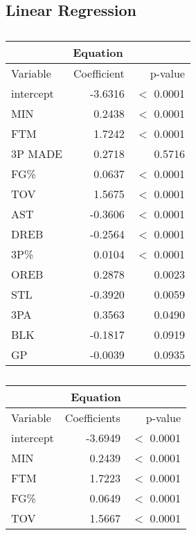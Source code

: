 \subsection*{Linear Regression}\label{appendix:lr}

\begin{table}[H]
	\begin{subtable}[h]{0.4\textwidth}
		\centering
		\begin{tabular}{|| l | r | r ||} 
			\hline
			\multicolumn{3}{|c|}{Equation} \\
			\hline
			Variable & Coefficient & p-value \\
			\hline
			intercept & -3.6316 & $<$ 0.0001 \\
			MIN & 0.2438 & $<$ 0.0001 \\
			FTM & 1.7242 & $<$ 0.0001 \\
			3P MADE & 0.2718 & 0.5716 \\
			FG\% & 0.0637 & $<$ 0.0001 \\
			TOV & 1.5675 & $<$ 0.0001 \\
			AST & -0.3606 & $<$ 0.0001 \\
			DREB & -0.2564 & $<$ 0.0001 \\
			3P\% & 0.0104 & $<$ 0.0001 \\
			OREB & 0.2878 & 0.0023 \\
			STL & -0.3920 & 0.0059 \\
			3PA & 0.3563 & 0.0490 \\
			BLK & -0.1817 & 0.0919 \\
			GP & -0.0039 & 0.0935 \\
			\hline
		\end{tabular}
		\caption{}
		\label{table:ForwardModelSummary}
	\end{subtable}
	\hfill
	\begin{subtable}[h]{0.4\textwidth}
		\centering
		\begin{tabular}{|| l | r | r ||} 
			\hline
			\multicolumn{3}{|c|}{Equation} \\
			\hline
			Variable & Coefficients & p-value \\
			\hline
			intercept & -3.6949 & $<$ 0.0001 \\
			MIN & 0.2439 & $<$ 0.0001 \\
			FTM & 1.7223 & $<$ 0.0001 \\
			FG\% & 0.0649 & $<$ 0.0001 \\
			TOV & 1.5667 & $<$ 0.0001 \\

\end{tabular}
\end{subtable}
\end{table}
